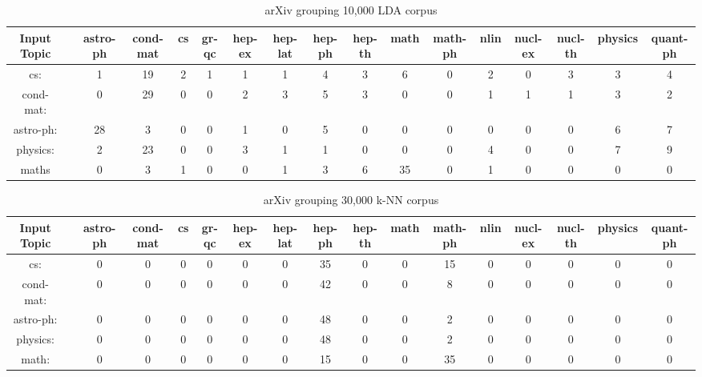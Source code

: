 \begin{sidewaystable}[h]
    \begin{tabular}{|c c c c c c c c c c c c c c c c c|}
         \hline
         Input Topic & & astro-ph & cond-mat & cs & gr-qc & hep-ex &hep-lat & hep-ph & hep-th & math & math-ph & nlin & nucl-ex & nucl-th & physics & quant-ph \\ [0.5ex]
         \hline\hline
         cs: & & 1 & 19 & 2 & 1 & 1 & 1 & 4 & 3 & 6 & 0 & 2 & 0 & 3 & 3 & 4 \\
         cond-mat: & & 0 & 29 & 0 & 0 & 2 & 3 & 5 & 3 & 0 & 0 & 1 & 1 & 1 & 3 & 2 \\
         astro-ph: & & 28 & 3 & 0 & 0 & 1 & 0 & 5 & 0 & 0 & 0 & 0 & 0 & 0 & 6 & 7 \\
         physics: & & 2 & 23 & 0 & 0 & 3 & 1 & 1 & 0 & 0 & 0 & 4 & 0 & 0 & 7 & 9 \\
         maths & & 0 & 3 & 1 & 0 & 0 & 1 & 3 & 6 & 35 & 0 & 1 & 0 & 0 & 0 & 0 \\ [1ex]
         \hline
    \end{tabular}
    \caption{arXiv grouping 10,000 LDA corpus}
    \label{table:arxiv10000lda}
\end{sidewaystable}

\begin{sidewaystable}[h]
    \begin{tabular}{|c c c c c c c c c c c c c c c c c|}
         \hline
         Input Topic & & astro-ph & cond-mat & cs & gr-qc & hep-ex &hep-lat & hep-ph & hep-th & math & math-ph & nlin & nucl-ex & nucl-th & physics & quant-ph \\ [0.5ex]
         \hline\hline
         cs: & & 0 & 0 & 0 & 0 & 0 & 0 & 35 & 0 & 0 & 15 & 0 & 0 & 0 & 0 & 0 \\
         cond-mat: & & 0 & 0 & 0 & 0 & 0 & 0 & 42 & 0 & 0 & 8 & 0 & 0 & 0 & 0 & 0 \\
         astro-ph: & & 0 & 0 & 0 & 0 & 0 & 0 & 48 & 0 & 0 & 2 & 0 & 0 & 0 & 0 & 0 \\
         physics: & & 0 & 0 & 0 & 0 & 0 & 0 & 48 & 0 & 0 & 2 & 0 & 0 & 0 & 0 & 0\\
         math: & & 0 & 0 & 0 & 0 & 0 & 0 & 15 & 0 & 0 & 35 & 0 & 0 & 0 & 0 & 0\\ [1ex]
         \hline
    \end{tabular}
    \caption{arXiv grouping 30,000 k-NN corpus}
    \label{table:arxiv30000knn}
\end{sidewaystable}


